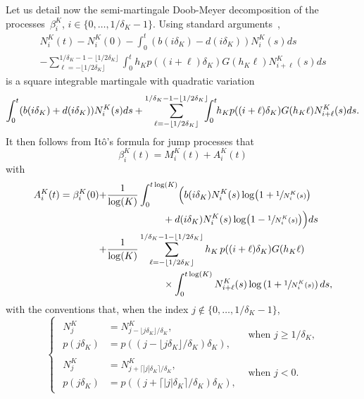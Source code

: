 \documentclass[10pt]{amsart}
\theoremstyle{plain}
\theoremstyle{remark}
\begin{document}
Let us detail now the semi-martingale Doob-Meyer decomposition of the processes~$\beta_{i}^K$, $i\in \{0,\dots, 1/\delta_{K}-1\}$. Using standard arguments~\cite{bansayemeleard},
\begin{multline}
N^K_i(t)-N^K_i(0)-\int_0^t(b(i\delta_K)-d(i\delta_K))N^K_i(s) ds \\ -\sum_{\ell=-\lfloor 1/2\delta_K\rfloor}^{1/\delta_K-1-\lfloor 1/2\delta_K\rfloor}\int_0^t h_Kp((i+\ell)\delta_K)G(h_{K}\ell)N^K_{i+\ell}(s)ds \label{eq:DM-N^K_i}
\end{multline}
is a square integrable martingale with quadratic variation
\[
\int_0^t(b(i\delta_K)+d(i\delta_K))N^K_i(s) ds
+\sum_{\ell=-\lfloor 1/2\delta_K\rfloor}^{1/\delta_K-1-\lfloor 1/2\delta_K\rfloor}\hspace*{-2mm}\int_0^t\hspace*{-1mm} h_Kp((i+\ell)\delta_K)G(h_{K}\ell)N^K_{i+\ell}(s)ds.
\]
It then follows from Itô's formula for jump processes that
\begin{equation}\label{decomposition}
\beta_{i}^K(t)=M^K_{i}(t) + A^K_{i}(t)
\end{equation}
with
\begin{align} A_{i}^K(t)= \beta_{i}^K(0) + & \frac{1}{\log(K)}\int_{0}^{t\log(K)}\Bigl(b(i \delta_{K})N^K_{i}(s) \log\bigl(1+\sfrac{1}{N^K_{i}(s)}\bigr) \label{def:A}\\
& \hspace{2cm}+ d(i \delta_{K})N^K_{i}(s) \log\bigl(1-\sfrac{1}{N^K_{i}(s)}\bigr)\Bigr) ds \\
+ & \frac{1}{\log(K)} \sum_{\ell=-\lfloor 1/2\delta_K\rfloor}^{1/\delta_K-1-\lfloor 1/2\delta_K\rfloor}
h_{K}\, p((i+\ell) \delta_{K}) G(h_{K}\ell) \\
& \hspace{2cm} \times \int_{0}^{t\log(K)}N^K_{i+\ell}(s)\log\left(1+\sfrac{1}{N^K_{i}(s)}\right) ds ,
\end{align}
with the conventions that, when the index $j\notin \{0,\dots, 1/\delta_K-1\}$,
\begin{equation}\label{eq:convention}
\begin{cases}
\begin{aligned}
N^K_{j}&=N^K_{j-\lfloor j\delta_K\rfloor/
\delta_K},\\
p(j\delta_K)&=p((j-\lfloor j\delta_K\rfloor/
\delta_K)\delta_K),
\end{aligned}
&\text{when }j\geq 1/\delta_K, \\[10pt]
\begin{aligned}
N^K_{j}&=N^K_{j+\lceil | j|\delta_K\rceil/
\delta_K},\\
p(j\delta_K)&=p((j+\lceil |j|\delta_K\rceil/
\delta_K)\delta_K),
\end{aligned}
&\text{when }j<0. 
\end{cases}
\end{equation}
\end{document}
